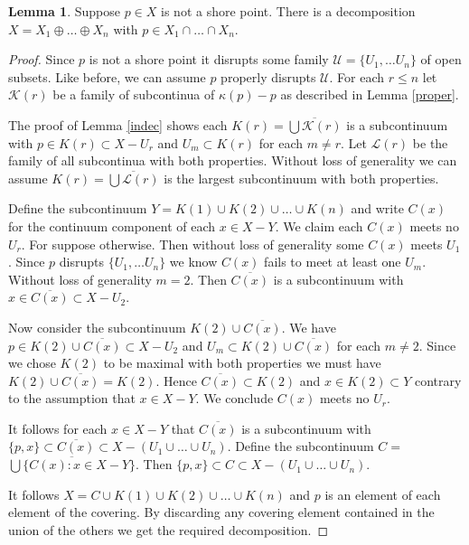 \documentclass[12pt]{article}
\theoremstyle{plain}
\theoremstyle{definition}
\newtheorem{lemma}[theorem]{Lemma}
\newcounter{claim5counter}
\newcommand{\K}{\ensuremath{\kappa}}
\newcommand{\0}{\ensuremath{\varnothing}}
\newcommand{\cL}{\ensuremath{\mathcal L}}
\newcommand{\cK}{\ensuremath{\mathcal K}}
\newcommand{\cU}{\ensuremath{\mathcal U}}
\begin{document}
\begin{lemma}\label{ndecomp}
Suppose $p \in X$ is not a shore point. 
There is a decomposition $X = X_1  \oplus \ldots \oplus X_n$ with $p \in X_1 \cap \ldots \cap X_n$.
\end{lemma}

\begin{proof}
Since $p$ is not a shore point it disrupts some family $\cU = \{U_1, \ldots U_n\}$ of open subsets.
Like before, we can assume $p$ properly disrupts $\cU$.
For each $r \le n$ let $\cK(r)$ be a family of subcontinua of $\K(p)-p$ as described in Lemma \ref{proper}.

The proof of Lemma \ref{indec} shows each $K(r) = \overline{ \bigcup \cK(r) }$ is a subcontinuum 
with $p \in K(r) \subset X-U_r$ and $U_m \subset K(r)$ for each $m \ne r$. Let $\cL(r)$ be the family of all subcontinua with both properties. Without loss of generality we can assume $K(r) = \overline{ \bigcup \cL(r) }$ is the largest subcontinuum with both properties.


Define the subcontinuum $Y = K(1) \cup K(2) \cup \ldots \cup K(n)$
and write $C(x)$ for the continuum component of each $x \in X-Y$.
We claim each $C(x)$ meets no $U_r$. 
For suppose otherwise.
Then without loss of generality some $C(x)$ meets $U_1$.
Since $p$ disrupts $\{U_1, \ldots U_n\}$ we know $C(x)$ fails to meet at least one $U_m$.
Without loss of generality $m=2$.
Then $\overline{C(x)}$ is a subcontinuum with $x \in \overline{C(x)} \subset X-U_2$.

Now consider the subcontinuum $K(2) \cup \overline{C(x)}$.
We have $p \in K(2) \cup \overline{C(x)} \subset X-U_2$ and $U_m \subset K(2) \cup \overline{C(x)}$ for each $m \ne 2$.
Since we chose $K(2)$ to be maximal with both properties we must have $K(2) \cup \overline{C(x)} = K(2)$.
Hence $\overline{C(x)} \subset K(2)$ and $x \in K(2) \subset Y$ contrary to the assumption that $x \in X-Y$.
We conclude $C(x)$ meets no $U_r$. 

It follows for each $x \in X-Y$ that $\overline {C(x)}$ is a subcontinuum with $\{p,x\} \subset \overline {C(x)} \subset X - (U_1 \cup \ldots \cup U_n)$.
Define the subcontinuum $C = $ $\overline{ \bigcup \{C(x): x \in X-Y\}}$.
Then $\{p,x\} \subset C \subset X - (U_1 \cup \ldots \cup U_n)$.

It follows $X = C \cup K(1) \cup K(2) \cup \ldots \cup K(n)$
and $p$ is an element of each element of the covering.
By discarding any covering element contained in the union of the others we get the required decomposition.
\end{proof}
\end{document}
